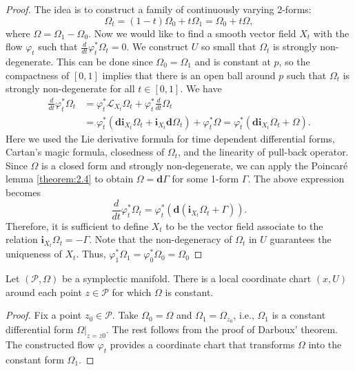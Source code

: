 \begin{proof}
The idea is to construct a family of continuously varying 2-forms:
\begin{equation*}
\Omega_t = (1-t)\Omega_0 + t\Omega_1 = \Omega_0 + t \Omega,
\end{equation*}
where $\Omega = \Omega_1 - \Omega_0$. Now we would like to find a smooth vector field $X_t$ with the flow $\varphi_t$ such that $\frac{d}{dt} \varphi_t^*\Omega_t = 0$. We construct $U$ so small that $\Omega_t$ is strongly non-degenerate. This can be done since $\Omega_0 = \Omega_1$ and is constant at $p$, so the compactness of $[0,1]$ implies that there is an open ball around $p$ such that $\Omega_t$ is strongly non-degenerate for all $t\in [0,1]$. We have
\begin{equation*}
\begin{aligned}
	\frac{d}{dt} \varphi_t^*\Omega_t &= \varphi_t^* \mathcal L_{X_t} \Omega_t + \varphi_t^* \frac{d}{dt} \Omega_t \\
	&= \varphi_t^*( \mathbf d \mathbf i_{X_t}\Omega_t + \mathbf i_{X_t} \mathbf d \Omega_t ) + \varphi_t^* \Omega
	= \varphi_t^*( \mathbf d \mathbf i_{X_t}\Omega_t + \Omega ).
\end{aligned}
\end{equation*}
Here we used the Lie derivative formula for time dependent differential forms, Cartan's magic formula, closedness of $\Omega_t$, and the linearity of pull-back operator. Since $\Omega$ is a closed form and strongly non-degenerate, we can apply the Poincar\'e lemma \ref{theorem:2.4} to obtain $\Omega = \mathbf d \Gamma$ for some 1-form $\Gamma$. The above expression becomes
\begin{equation*}
	\frac{d}{dt} \varphi_t^*\Omega_t = \varphi_t^*( \mathbf d ( \mathbf i_{X_t}\Omega_t + \Gamma ) ).
\end{equation*}
Therefore, it is sufficient to define $X_t$ to be the vector field associate to the relation $\mathbf i_{X_t}\Omega_t = - \Gamma$. Note that the non-degeneracy of $\Omega_t$ in $U$ guarantees the uniqueness of $X_t$. Thus, $\varphi_1^* \Omega_1 = \varphi_0^* \Omega_0 = \Omega_0$
\end{proof}

\begin{corollary} \label{theorem:2.6}
Let $(\mathcal P, \Omega)$ be a symplectic manifold. There is a local coordinate chart $(x,U)$ around each point $z\in\mathcal P$ for which $\Omega$ is constant.
\end{corollary}
\begin{proof}
Fix a point $z_0 \in \mathcal P$. Take $\Omega_0 = \Omega$ and $\Omega_1 = \Omega_{z_0}$, i.e., $\Omega_1$ is a constant differential form $\Omega|_{z = z0}$. The rest follows from the proof of Darboux' theorem. The constructed flow $\varphi_t$ provides a coordinate chart that transforms $\Omega$ into the constant form $\Omega_1$.
\end{proof}

